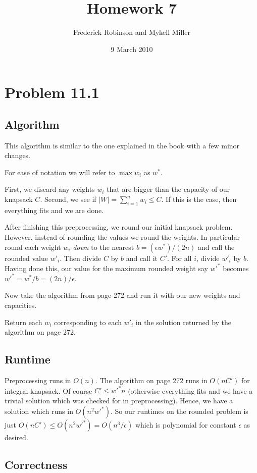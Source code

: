 \documentclass{article}
\title{Homework 7}
\author{Frederick Robinson and Mykell Miller}
\date{9 March 2010}
\begin{document}

   \maketitle
\section{Problem 11.1}
\subsection{Algorithm}
This algorithm is similar to the one explained in the book with a few minor changes. 

For ease of notation we will refer to $\max{w_i}$ as $w^*$.

First, we discard any weights $w_i$ that are bigger than the capacity of our knapsack $C$. Second, we see if $|W| = \sum_{i=1}^n w_i \leq C$. If this is the case, then everything fits and we are done. 

After finishing this preprocessing, we round our initial knapsack problem. However, instead of rounding the values we round the weights. In particular round each weight $w_i$ \emph{down}  to the nearest $b =( \epsilon w^*) /( 2n)$ and call the rounded value $w'_i$. Then divide $C$ by $b$ and call it $C'$. For all $i$, divide $w'_i$ by $b$. Having done this, our value for the maximum rounded weight say $w'^*$ becomes $w'^*=w^*/b = (2n) / \epsilon$.

Now take the algorithm from page 272 and run it with our new weights and capacities. 

Return each $w_i$ corresponding to each $w'_i$ in the solution returned by the algorithm on page 272.

\subsection{Runtime}
Preprocessing runs in $O(n)$. The algorithm on page 272 runs in $O(nC')$ for integral knapsack. Of course $C' \leq w'^* n$ (otherwise everything fits and we have a trivial solution which was checked for in preprocessing). Hence, we have a solution which runs in $O(n^2 w'^*)$. So our runtimes on the rounded problem is just $O(nC') \leq O(n^2 w'^*) = O(n^3 /\epsilon)$ which is polynomial for constant $\epsilon$ as desired.

\subsection{Correctness}
\end{document}
